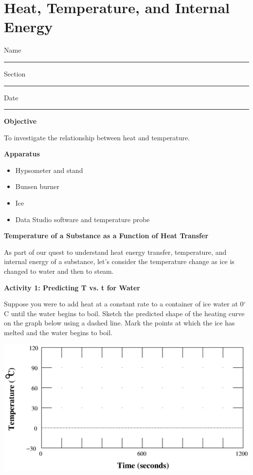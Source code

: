 
\section{Heat, Temperature, and Internal Energy}

Name \rule{2.0in}{0.1pt}\hfill{}Section \rule{1.0in}{0.1pt}\hfill{}Date
\rule{1.0in}{0.1pt}

\textbf{Objective}

To investigate the relationship between heat and temperature.

\textbf{Apparatus}

\begin{itemize}
\item Hypsometer and stand 
\item Bunsen burner
\item Ice
\item Data Studio software and temperature probe
\end{itemize}
\textbf{Temperature of a Substance as a Function of Heat Transfer}

As part of our quest to understand heat energy transfer, temperature,
and internal energy of a substance, let's consider the temperature
change as ice is changed to water and then to steam.

\textbf{Activity 1: Predicting T vs. t for Water} 

Suppose you were to add heat at a constant rate to a container of
ice water at 0\( ^{\circ } \)C until the water begins to boil. Sketch
the predicted shape of the heating curve on the graph below using
a dashed line. Mark the points at which the ice has melted and the
water begins to boil.

\vspace{0.3cm}
{\centering \includegraphics{heat_temp_int_energy_fig_1.eps} \par}
\vspace{0.3cm}

